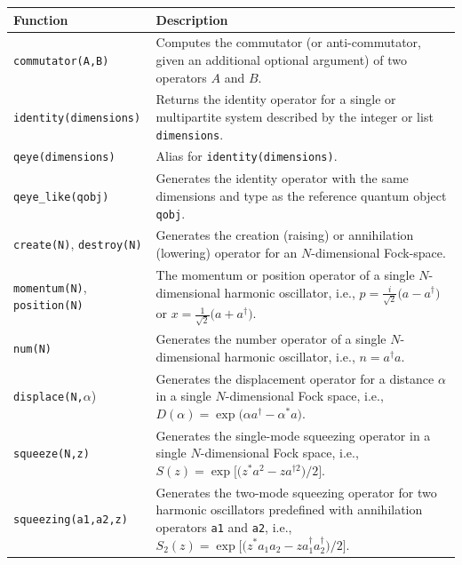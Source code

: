 \documentclass[preprint,3p,sort&compress]{elsarticle}
\def\code#1{\texttt{#1}}
\begin{document}
\begin{table}[ht]
    \centering
         \renewcommand{\arraystretch}{1.2} 
    \begin{tabular}{@{}lp{9.6cm}@{}}
        \toprule
        \textbf{Function} & \textbf{Description} \\
        \midrule
        \code{commutator(A,B)} & Computes the commutator (or anti-commutator, given an additional optional argument) of two operators $A$ and $B$. \\
      
        \code{identity(dimensions)} & Returns the identity operator for a single or multipartite system described by the integer or list \code{dimensions}. \\
   
        \code{qeye(dimensions)} & Alias for \code{identity(dimensions)}. \\
  
        \code{qeye\_like(qobj)} & Generates the identity operator with the same dimensions and type as the reference quantum object \code{qobj}. \\
    
        \code{create(N)},  \code{destroy(N)} & Generates the creation (raising) or annihilation (lowering) operator for an $N$-dimensional Fock-space. \\
     
        \code{momentum(N)}, \code{position(N)} & The momentum or position operator of a single $N$-dimensional harmonic oscillator, i.e., $p=\frac{i}{\sqrt{2}} \bigl(a-a^{\dagger}\bigr)$ or $x=\frac{1}{\sqrt{2}}\bigl(a+a^{\dagger}\bigr)$.\\
   
        \code{num(N)} & Generates the number operator of a single $N$-dimensional harmonic oscillator, i.e., $n = a^{\dagger}a$. \\

        \code{displace(N,$\alpha$}) & Generates the displacement operator for a distance $\alpha$ in a single $N$-dimensional Fock space, i.e., $D(\alpha) = \exp\bigl( \alpha a^{\dagger} - \alpha^* a \bigr)$.\\
       
        \code{squeeze(N,z)} & Generates the single-mode squeezing operator in a single $N$-dimensional Fock space, i.e., $S(z) = \exp\bigl[ \bigl( z^* a^{2} - z a^{\dagger 2} \bigr) / 2 \bigr]$. \\
 
        \code{squeezing(a1,a2,z)} & Generates the two-mode squeezing operator for two harmonic oscillators predefined with annihilation operators \code{a1} and \code{a2}, i.e., $S_2(z) = \exp\bigl[ \bigl( z^*a_1a_2 - za_1^\dagger a_2^\dagger \bigr) / 2 \bigr]$. \\
     

\end{tabular}
\end{table}
\end{document}
